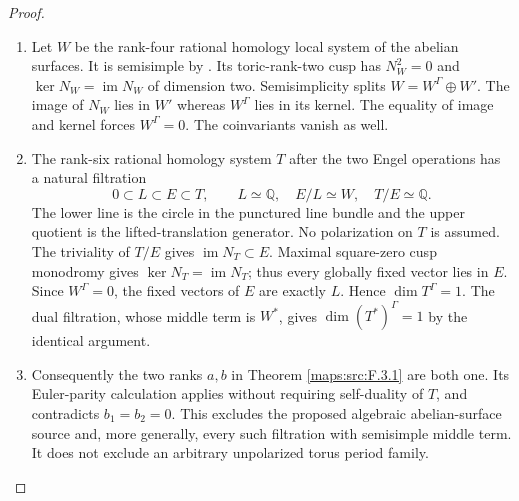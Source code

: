 \begin{proof}
\begin{enumerate}[label=\arabic*.]
\item Let $W$ be the rank-four rational homology local system of the
abelian surfaces.  It is semisimple by
\cite[Definition 4.2.4 and Proposition 4.2.5, p.~44; Theorem 4.2.6, p.~45]{ffDeligne}.
Its toric-rank-two cusp has
$N_W^2=0$ and $\ker N_W=\operatorname{im}N_W$ of dimension two.
Semisimplicity splits $W=W^\Gamma\oplus W'$.
The image of $N_W$ lies in $W'$ whereas $W^\Gamma$ lies in its
kernel.  The equality of image and kernel forces $W^\Gamma=0$.
The coinvariants vanish as well.

\item The rank-six rational homology system $T$ after the two Engel
operations has a natural filtration
\[
 0\subset L\subset E\subset T,\qquad
 L\simeq\mathbb Q,\quad E/L\simeq W,\quad T/E\simeq\mathbb Q.
\]
The lower line is the circle in the punctured line bundle and
the upper quotient is the lifted-translation generator.
No polarization on $T$ is assumed.
The triviality of $T/E$ gives $\operatorname{im}N_T\subset E$.
Maximal square-zero cusp monodromy gives
$\ker N_T=\operatorname{im}N_T$; thus every globally fixed vector
lies in $E$.  Since $W^\Gamma=0$, the fixed vectors of $E$ are
exactly $L$.  Hence $\dim T^\Gamma=1$.
The dual filtration, whose middle term is $W^*$, gives
$\dim(T^*)^\Gamma=1$ by the identical argument.

\item Consequently the two ranks $a,b$ in Theorem \ref{maps:src:F.3.1} are both one.
Its Euler-parity calculation applies without requiring self-duality
of $T$, and contradicts $b_1=b_2=0$.
This excludes the proposed algebraic abelian-surface source and,
more generally, every such filtration with semisimple middle term.
It does not exclude an arbitrary unpolarized torus period family.

\end{enumerate}
\end{proof}




